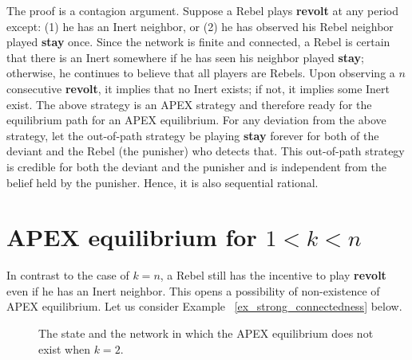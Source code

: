\documentclass[12pt,letter]{article}
\theoremstyle{definition}
\theoremstyle{remark}
\theoremstyle{claim}
\begin{document}
The proof is a contagion argument. Suppose a Rebel plays \textbf{revolt} at any period except: (1) he has an Inert neighbor, or (2) he has observed his Rebel neighbor played \textbf{stay} once. Since the network is finite and connected, a Rebel is certain that there is an Inert somewhere if he has seen his neighbor played \textbf{stay}; otherwise, he continues to believe that all players are Rebels. Upon observing a $n$ consecutive \textbf{revolt}, it implies that no Inert exists; if not, it implies some Inert exist. The above strategy is an APEX strategy and therefore ready for the equilibrium path for an APEX equilibrium. For any deviation from the above strategy, let the out-of-path strategy be playing \textbf{stay} forever for both of the deviant and the Rebel (the punisher) who detects that. This out-of-path strategy is credible for both the deviant and the punisher and is independent from the belief held by the punisher. Hence, it is also sequential rational.


\section{APEX equilibrium for $1<k<n$}
\label{sec:equilibrium_2}

In contrast to the case of $k=n$, a Rebel still has the incentive to play \textbf{revolt} even if he has an Inert neighbor. This opens a possibility of non-existence of APEX equilibrium. Let us consider Example ~\ref{ex_strong_connectedness} below.

\begin{figure}
\caption{The state and the network in which the APEX equilibrium does not exist when $k=2$.}


\begin{center}
\end{center}

\label{fig:strong_connectedness}

\end{figure}
\end{document}
